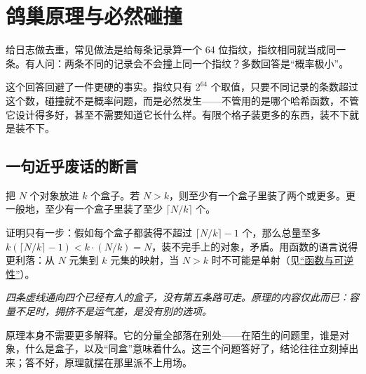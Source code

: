 \section{鸽巢原理与必然碰撞}
\label{sec:04-Discrete-Mathematics/01-Combinatorics/03}

给日志做去重，常见做法是给每条记录算一个 64 位指纹，指纹相同就当成同一条。有人问：两条不同的记录会不会撞上同一个指纹？多数回答是``概率极小''。

这个回答回避了一件更硬的事实。指纹只有 \(2^{64}\) 个取值，只要不同记录的条数超过这个数，碰撞就不是概率问题，而是必然发生——不管用的是哪个哈希函数，不管它设计得多好，甚至不需要知道它长什么样。有限个格子装更多的东西，装不下就是装不下。

\subsection{一句近乎废话的断言}

\begin{theorem}[鸽巢原理]
把 \(N\) 个对象放进 \(k\) 个盒子。若 \(N>k\)，则至少有一个盒子里装了两个或更多。更一般地，至少有一个盒子里装了至少 \(\lceil N/k\rceil\) 个。
\end{theorem}

证明只有一步：假如每个盒子都装得不超过 \(\lceil N/k\rceil-1\) 个，那么总量至多 \(k(\lceil N/k\rceil-1)<k\cdot(N/k)=N\)，装不完手上的对象，矛盾。用函数的语言说得更利落：从 \(N\) 元集到 \(k\) 元集的映射，当 \(N>k\) 时不可能是单射（见\hyperref[sec:01-Mathematical-Language/02-Sets-Relations-Functions/04]{``函数与可逆性''}）。

\begin{center}

\emph{四条虚线通向四个已经有人的盒子，没有第五条路可走。原理的内容仅此而已：容量不足时，拥挤不是运气差，是没有别的选项。}
\end{center}

原理本身不需要更多解释。它的分量全部落在别处——在陌生的问题里，谁是对象，什么是盒子，以及``同盒''意味着什么。这三个问题答好了，结论往往立刻掉出来；答不好，原理就摆在那里派不上用场。

